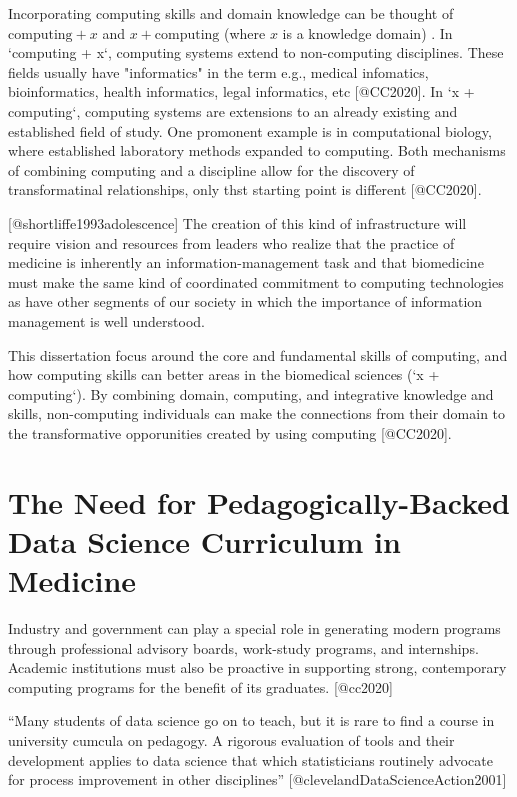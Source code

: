 \documentclass[../main.tex]{subfiles}
\begin{document}
        Incorporating computing skills and domain knowledge can be thought of
        $\text{computing} + x$ and $x + \text{computing}$ (where $x$ is a knowledge domain)
        \cite{cc2020}.
        In `computing + x`, computing systems extend to non-computing disciplines.
        These fields usually have "informatics" in the term
        e.g., medical infomatics, bioinformatics, health informatics, legal informatics, etc [@CC2020].
        In `x + computing`,
        computing systems are extensions to an already existing and established field of study.
        One promonent example is in computational biology,
        where established laboratory methods expanded to computing.
        Both mechanisms of combining computing and a discipline allow for the discovery of transformatinal relationships,
        only thst starting point is different [@CC2020].

        [@shortliffe1993adolescence]
        The creation of this kind of infrastructure will require vision and resources from leaders who realize that the practice of medicine is inherently an information-management task and that biomedicine must make the same kind of coordinated commitment to computing technologies as have other segments of our society in which the importance of information management is well understood.

        This dissertation focus around the core and fundamental skills
        of computing, and how computing skills can better areas in the biomedical sciences (`x + computing`).
        By combining domain, computing, and integrative knowledge and skills,
        non-computing individuals can make the connections from their domain to the transformative opporunities
        created by using computing [@CC2020].

    \section{The Need for Pedagogically-Backed Data Science Curriculum in Medicine}
        \label{se:intro-ds-edu-gaps}
        
        Industry and government can play a special role in generating modern programs through
        professional advisory boards, work-study programs, and internships.
        Academic institutions must also be proactive in
        supporting strong, contemporary computing programs for the benefit of its graduates. [@cc2020]
    
        ``Many students of data science
        go on to teach, but it is rare to find a course in university cumcula on pedagogy.
        A
        rigorous evaluation
        of tools and their development applies to data science that which statisticians routinely advocate for
        process improvement in other disciplines'' [@clevelandDataScienceAction2001]
        
\end{document}
